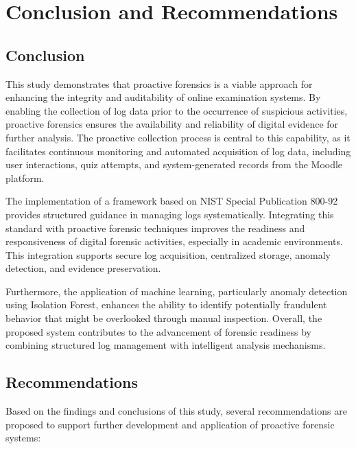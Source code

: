 \chapter{Conclusion and Recommendations}

\section{Conclusion}

This study demonstrates that proactive forensics is a viable approach for enhancing the integrity and auditability of online examination systems. By enabling the collection of log data prior to the occurrence of suspicious activities, proactive forensics ensures the availability and reliability of digital evidence for further analysis. The proactive collection process is central to this capability, as it facilitates continuous monitoring and automated acquisition of log data, including user interactions, quiz attempts, and system-generated records from the Moodle platform.

The implementation of a framework based on NIST Special Publication 800-92 provides structured guidance in managing logs systematically. Integrating this standard with proactive forensic techniques improves the readiness and responsiveness of digital forensic activities, especially in academic environments. This integration supports secure log acquisition, centralized storage, anomaly detection, and evidence preservation.

Furthermore, the application of machine learning, particularly anomaly detection using Isolation Forest, enhances the ability to identify potentially fraudulent behavior that might be overlooked through manual inspection. Overall, the proposed system contributes to the advancement of forensic readiness by combining structured log management with intelligent analysis mechanisms.

\section{Recommendations}

Based on the findings and conclusions of this study, several recommendations are proposed to support further development and application of proactive forensic systems:

